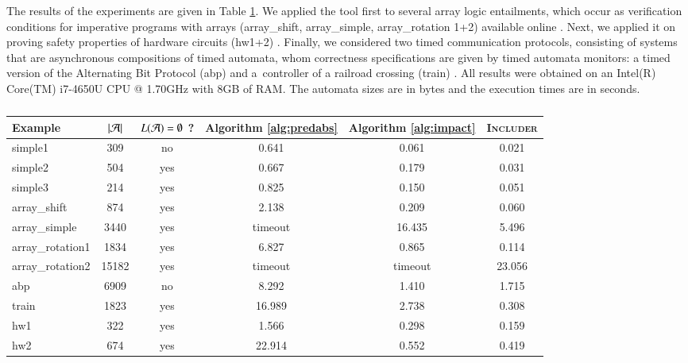 \documentclass[10pt,conference,letterpaper,twocolumn]{IEEEtran}
\begin{document}
The results of the experiments are given in Table
\ref{tab:experiments}. We applied the tool first to several array
logic entailments, which occur as verification conditions for
imperative programs with arrays \cite{cav09} (array\_shift,
array\_simple, array\_rotation 1+2) available online
\cite{ntslib}. Next, we applied it on proving safety properties of
hardware circuits (hw1+2) \cite{smrcka}. Finally, we considered two
timed communication protocols, consisting of systems that are
asynchronous compositions of timed automata, whom correctness
specifications are given by timed automata monitors: a timed version of
the Alternating Bit Protocol (abp) \cite{abp} and a~controller of a
railroad crossing (train) \cite{henzinger:RealTimeSystems}. All
results were obtained on an Intel(R) Core(TM) i7-4650U CPU @ 1.70GHz
with 8GB of RAM. The automata sizes are in bytes and the execution
times are in seconds.

\begin{table}[htb]
\begin{center}
{\fontsize{8}{9}\selectfont
\begin{tabular}{||l|c|c|c|c|c||}
\hline
Example & ${|{\mathcal{A}}|}$ & $L(\mathcal{A})=\emptyset$ ? & Algorithm \ref{alg:predabs} & Algorithm \ref{alg:impact} & \textsc{Includer} \\
\hline
simple1 & 309 & no & 0.641 & 0.061 & 0.021\\
\hline
simple2 & 504 & yes & 0.667 & 0.179 & 0.031\\
\hline
simple3 & 214 & yes & 0.825 & 0.150 & 0.051\\
\hline
array\_shift & 874 & yes & 2.138 & 0.209 & 0.060\\
\hline
array\_simple & 3440 & yes & timeout & 16.435 & 5.496\\
\hline
array\_rotation1 & 1834 & yes & 6.827 & 0.865 & 0.114\\
\hline
array\_rotation2 & 15182 & yes & timeout & timeout & 23.056\\
\hline
abp & 6909 & no & 8.292 & 1.410 & 1.715\\
\hline
train & 1823 & yes & 16.989 & 2.738 & 0.308\\
\hline
hw1 & 322 & yes & 1.566 & 0.298 & 0.159\\
\hline
hw2 & 674 & yes & 22.914 & 0.552 & 0.419\\
\hline
\end{tabular}
}
\caption{}\label{tab:experiments}
\end{center}
\end{table}
\end{document}
